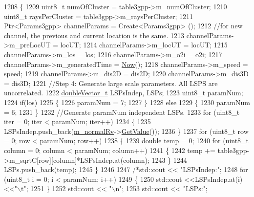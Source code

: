 \begin{DoxyCode}
1208 \{
1209         uint8\_t numOfCluster = table3gpp->m\_numOfCluster;
1210         uint8\_t raysPerCluster = table3gpp->m\_raysPerCluster;
1211         Ptr<Params3gpp> channelParams = Create<Params3gpp> ();
1212         \textcolor{comment}{//for new channel, the previous and current location is the same.}
1213         channelParams->m\_preLocUT = locUT;
1214         channelParams->m\_locUT = locUT;
1215         channelParams->m\_los = los;
1216         channelParams->m\_o2i = o2i;
1217         channelParams->m\_generatedTime = \hyperlink{group__simulator_gac3635e2e87f7ce316c89290ee1b01d0d}{Now}();
1218         channelParams->m\_speed = \hyperlink{mmwave-amc-test_8cc_a6dc6e6f3c75c509ce943163afb5dade7}{speed};
1219         channelParams->m\_dis2D = dis2D;
1220         channelParams->m\_dis3D = dis3D;
1221         \textcolor{comment}{//Step 4: Generate large scale parameters. All LSPS are uncorrelated.}
1222         \hyperlink{namespacens3_aa6f1edf6566ca6afec613bc6e40240ea}{doubleVector\_t} LSPsIndep, LSPs;
1223         uint8\_t paramNum;
1224         \textcolor{keywordflow}{if}(los)
1225         \{
1226                 paramNum = 7;
1227         \}
1228         \textcolor{keywordflow}{else}
1229         \{
1230                 paramNum = 6;
1231         \}
1232         \textcolor{comment}{//Generate paramNum independent LSPs.}
1233         \textcolor{keywordflow}{for} (uint8\_t iter = 0; iter < paramNum; iter++)
1234         \{
1235                 LSPsIndep.push\_back(\hyperlink{classns3_1_1MmWave3gppChannel_ac2e02ebacc72ed96518d785f2dc87c57}{m\_normalRv}->\hyperlink{classns3_1_1NormalRandomVariable_a0134d131477bc439cc6ff7cbe84b03a9}{GetValue}());
1236         \}
1237         \textcolor{keywordflow}{for} (uint8\_t row = 0; row < paramNum; row++)
1238         \{
1239                 \textcolor{keywordtype}{double} temp = 0;
1240                 \textcolor{keywordflow}{for} (uint8\_t column = 0; column < paramNum; column++)
1241                 \{
1242                         temp += table3gpp->m\_sqrtC[row][column]*LSPsIndep.at(column);
1243                 \}
1244                 LSPs.push\_back(temp);
1245         \}
1246 
1247         \textcolor{comment}{/*std::cout << "LSPsIndep:";}
1248 \textcolor{comment}{        for (uint8\_t i = 0; i < paramNum; i++)}
1249 \textcolor{comment}{        \{}
1250 \textcolor{comment}{                std::cout <<LSPsIndep.at(i)<<"\(\backslash\)t";}
1251 \textcolor{comment}{        \}}
1252 \textcolor{comment}{        std::cout << "\(\backslash\)n";}
1253 \textcolor{comment}{        std::cout << "LSPs:";}

\end{DoxyCode}
